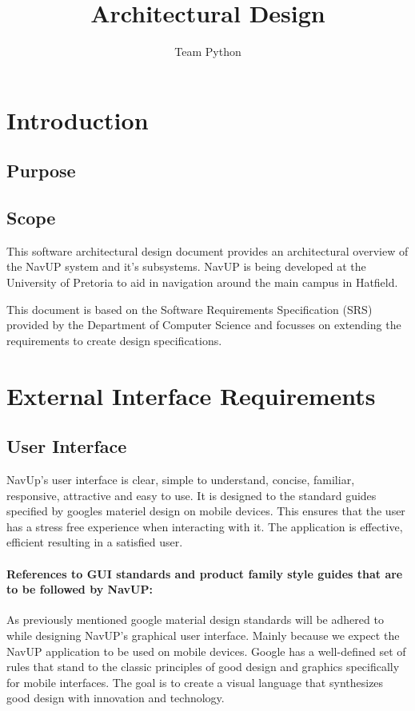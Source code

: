 \documentclass[11pt]{article}
\author{Team Python}
\title{Architectural Design}
\begin{document}
	\setlength{\parskip}{6pt}
	
	\tableofcontents
	\newpage
	
	\section{Introduction}
    \subsection{Purpose}
	\subsection{Scope}
    This software architectural design document provides an architectural overview of the NavUP system and it's subsystems. NavUP is being developed at the University of Pretoria to aid in navigation around the main campus in Hatfield.

    This document is based on the Software Requirements Specification (SRS) provided by the Department of Computer Science and focusses on extending the requirements to create design specifications.

	
	\section{External Interface Requirements}
	\subsection{User Interface}
	NavUp's user interface is clear, simple to understand, concise, familiar, responsive, attractive and easy to use. It is designed to the standard guides specified by googles materiel design on mobile devices. This ensures that the user has a stress free experience when interacting with it. 
	The application is effective, efficient resulting in a satisfied user.
	
    \paragraph{References to GUI standards and product family style guides that are to be followed by NavUP: } 
		
		As previously mentioned google material design standards will be adhered to while designing NavUP’s graphical user interface. Mainly because we expect the NavUP application to be used on mobile devices. 
		Google has a well-defined set of rules that stand to the classic principles of good design and graphics specifically for mobile interfaces. The goal is to create a visual language that synthesizes good design with innovation and technology. 
		
\end{document}
